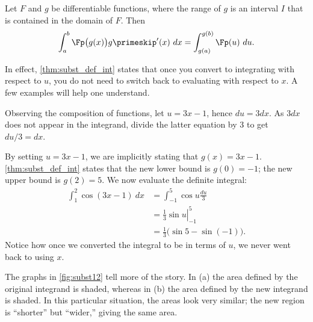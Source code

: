 {Let $F$ and $g$ be differentiable functions, where the range of $g$ is an interval $I$ that is contained in the domain of $F$. Then 
$$\int_a^b \Fp\big(g(x)\big)g\primeskip'(x)\ dx = \int_{g(a)}^{g(b)} \Fp(u)\ du.$$
}

In effect, \autoref{thm:subst_def_int} states that once you convert to integrating with respect to $u$, you do not need to switch back to evaluating with respect to $x$. A few examples will help one understand.\\

{
{%
}%
{%
}%
%
Observing the composition of functions, let $u=3x-1$, hence $du = 3dx$. As $3dx$ does not appear in the integrand, divide the latter equation by 3 to get $du/3 = dx$. 

By setting $u = 3x-1$, we are implicitly stating that $g(x) = 3x-1$. \autoref{thm:subst_def_int} states that the new lower bound is $g(0) = -1$; the new upper bound is $g(2) = 5$. We now evaluate the definite integral:
\begin{align*}
	\int_1^2 \cos(3x-1) \ dx
	&= \int_{-1}^5 \cos u \frac{du}{3} \\
	&= \left.\frac{1}{3} \sin u\right|_{-1}^5 \\
	&= \frac{1}{3}\big(\sin 5- \sin (-1)\big).%
\end{align*}
Notice how once we converted the integral to be in terms of $u$, we never went back to using $x$.

The graphs in \autoref{fig:subst12} tell more of the story. In (a) the area defined by the original integrand is shaded, whereas in (b) the area defined by the new integrand is shaded. In this particular situation, the areas look very similar; the new region is ``shorter'' but ``wider,'' giving the same area.}

